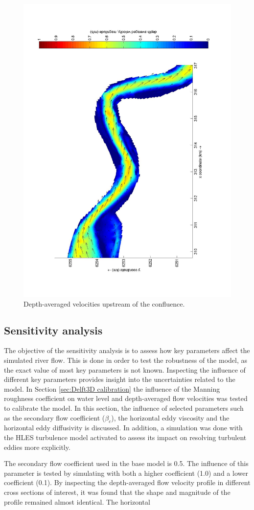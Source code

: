 \begin{figure}[H]
    \centering
    \includegraphics[width=0.8\linewidth, angle=270]{figures/ch7/dav_upstream_bends.jpg}
    \caption{Depth-averaged velocities upstream of the confluence.}
    \label{fig:dav bends}
\end{figure}

\subsection{Sensitivity analysis}
\label{Sensitivity analysis}
The objective of the sensitivity analysis is to assess how key parameters affect the simulated river flow. This is done in order to test the robustness of the model, as the exact value of most key parameters is not known. Inspecting the influence of different key parameters provides insight into the uncertainties related to the model. In Section \ref{sec:Delft3D calibration} the influence of the Manning roughness coefficient on water level and depth-averaged flow velocities was tested to calibrate the model. In this section, the influence of selected parameters such as the secondary flow coefficient ($\beta_c$), the horizontal eddy viscosity and the horizontal eddy diffusivity is discussed. In addition, a simulation was done with the HLES turbulence model activated to assess its impact on resolving turbulent eddies more explicitly. 

The secondary flow coefficient used in the base model is 0.5. The influence of this parameter is tested by simulating with both a higher coefficient (1.0) and a lower coefficient (0.1). By inspecting the depth-averaged flow velocity profile in different cross sections of interest, it was found that the shape and magnitude of the profile remained almost identical. The horizontal
